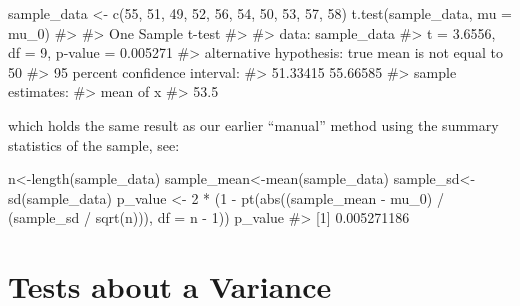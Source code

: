 \documentclass[
  letterpaper,
  DIV=11,
  numbers=noendperiod]{scrreprt}
\newenvironment{Shaded}{\begin{snugshade}}{\end{snugshade}}
\newcommand{\AttributeTok}[1]{\textcolor[rgb]{0.40,0.45,0.13}{#1}}
\newcommand{\CommentTok}[1]{\textcolor[rgb]{0.37,0.37,0.37}{#1}}
\newcommand{\DecValTok}[1]{\textcolor[rgb]{0.68,0.00,0.00}{#1}}
\newcommand{\FunctionTok}[1]{\textcolor[rgb]{0.28,0.35,0.67}{#1}}
\newcommand{\NormalTok}[1]{\textcolor[rgb]{0.00,0.23,0.31}{#1}}
\newcommand{\OtherTok}[1]{\textcolor[rgb]{0.00,0.23,0.31}{#1}}
\newcommand{\SpecialCharTok}[1]{\textcolor[rgb]{0.37,0.37,0.37}{#1}}
\begin{document}
\begin{Shaded}
\begin{Highlighting}[]
\NormalTok{sample\_data }\OtherTok{\textless{}{-}} \FunctionTok{c}\NormalTok{(}\DecValTok{55}\NormalTok{, }\DecValTok{51}\NormalTok{, }\DecValTok{49}\NormalTok{, }\DecValTok{52}\NormalTok{, }\DecValTok{56}\NormalTok{, }\DecValTok{54}\NormalTok{, }\DecValTok{50}\NormalTok{, }\DecValTok{53}\NormalTok{, }\DecValTok{57}\NormalTok{, }\DecValTok{58}\NormalTok{)}
\FunctionTok{t.test}\NormalTok{(sample\_data, }\AttributeTok{mu =}\NormalTok{ mu\_0)}
\CommentTok{\#\textgreater{} }
\CommentTok{\#\textgreater{}  One Sample t{-}test}
\CommentTok{\#\textgreater{} }
\CommentTok{\#\textgreater{} data:  sample\_data}
\CommentTok{\#\textgreater{} t = 3.6556, df = 9, p{-}value = 0.005271}
\CommentTok{\#\textgreater{} alternative hypothesis: true mean is not equal to 50}
\CommentTok{\#\textgreater{} 95 percent confidence interval:}
\CommentTok{\#\textgreater{}  51.33415 55.66585}
\CommentTok{\#\textgreater{} sample estimates:}
\CommentTok{\#\textgreater{} mean of x }
\CommentTok{\#\textgreater{}      53.5}
\end{Highlighting}
\end{Shaded}

which holds the same result as our earlier ``manual'' method using the
summary statistics of the sample, see:

\begin{Shaded}
\begin{Highlighting}[]
\NormalTok{n}\OtherTok{\textless{}{-}}\FunctionTok{length}\NormalTok{(sample\_data)}
\NormalTok{sample\_mean}\OtherTok{\textless{}{-}}\FunctionTok{mean}\NormalTok{(sample\_data)}
\NormalTok{sample\_sd}\OtherTok{\textless{}{-}}\FunctionTok{sd}\NormalTok{(sample\_data)}
\NormalTok{p\_value }\OtherTok{\textless{}{-}} \DecValTok{2} \SpecialCharTok{*}\NormalTok{ (}\DecValTok{1} \SpecialCharTok{{-}} \FunctionTok{pt}\NormalTok{(}\FunctionTok{abs}\NormalTok{((sample\_mean }\SpecialCharTok{{-}}\NormalTok{ mu\_0) }\SpecialCharTok{/}\NormalTok{ (sample\_sd }\SpecialCharTok{/} \FunctionTok{sqrt}\NormalTok{(n))), }\AttributeTok{df =}\NormalTok{ n }\SpecialCharTok{{-}} \DecValTok{1}\NormalTok{))}
\NormalTok{p\_value}
\CommentTok{\#\textgreater{} [1] 0.005271186}
\end{Highlighting}
\end{Shaded}

\section{Tests about a Variance}\label{tests-about-a-variance}
\end{document}
